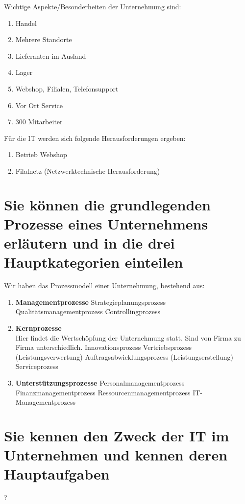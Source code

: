 Wichtige Aspekte/Besonderheiten der Unternehmung sind:
\begin{enumerate}
	\item Handel
	\item Mehrere Standorte
	\item Lieferanten im Ausland
	\item Lager
	\item Webshop, Filialen, Telefonsupport
	\item Vor Ort Service
	\item 300 Mitarbeiter
\end{enumerate}

Für die IT werden sich folgende Herausforderungen ergeben:
\begin{enumerate}
	\item Betrieb Webshop
	\item Filalnetz (Netzwerktechnische Herausforderung)
\end{enumerate}
\section{Sie können die grundlegenden Prozesse eines Unternehmens erläutern und in die drei Hauptkategorien einteilen}
Wir haben das Prozessmodell einer Unternehmung, bestehend aus:
\begin{enumerate}
	\item \textbf{Managementprozesse}
		\subitem Strategieplanungsprozess
		\subitem Qualitätsmanagementprozess
		\subitem Controllingprozess
	\item \textbf{Kernprozesse} \\
		Hier findet die Wertschöpfung der Unternehmung statt. Sind von Firma zu Firma unterschiedlich.
		\subitem Innovationsprozess
		\subitem Vertriebsprozess (Leistungsverwertung)
		\subitem Auftragsabwicklungsprozess (Leistungserstellung)
		\subitem Serviceprozess
	\item \textbf{Unterstützungsprozesse}
		\subitem Personalmanagementprozess
		\subitem Finanzmanagementprozess
		\subitem Ressourcenmanagementprozess
		\subitem IT-Managementprozess
\end{enumerate}
\section{Sie kennen den Zweck der IT im Unternehmen und kennen deren Hauptaufgaben}
?